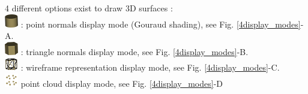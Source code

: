 4 different options exist to draw 3D surfaces :\\
\includegraphics[scale=0.7]{images/06/display/point_normals.png} : point normals display mode (Gouraud shading), see Fig. \ref{4display_modes}-A.\\
\includegraphics[scale=0.7]{images/06/display/cell_normals.png} : triangle normals display mode, see Fig. \ref{4display_modes}-B. \\
\includegraphics[scale=0.7]{images/06/display/wireframe.png} : wireframe representation  display mode, see Fig. \ref{4display_modes}-C.\\
\includegraphics[scale=0.7]{images/06/display/points.png} point cloud display mode, see Fig. \ref{4display_modes}-D\\

